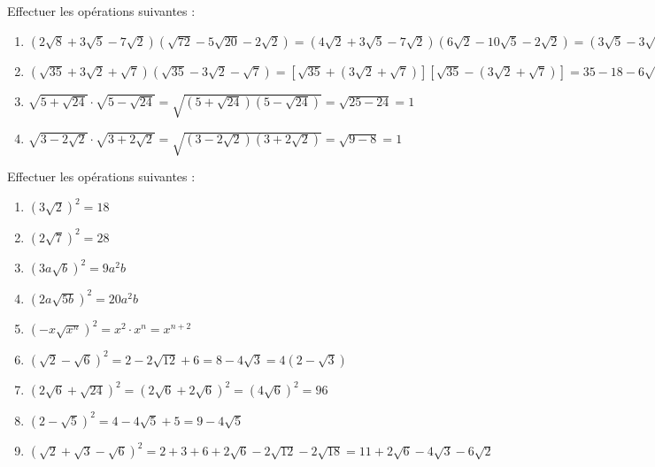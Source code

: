\begin{solution}
Effectuer les opérations suivantes :
\begin{enumerate}
\item $\left( 2\sqrt{8}+3\sqrt{5}-7\sqrt{2} \right)\left( \sqrt{72}-5\sqrt{20}-2\sqrt{2} \right)=\left( 4\sqrt{2}+3\sqrt{5}-7\sqrt{2} \right)\left( 6\sqrt{2}-10\sqrt{5}-2\sqrt{2} \right)=\left( 3\sqrt{5}-3\sqrt{2} \right)\left( 4\sqrt{2}-10\sqrt{5} \right)=6\left( \sqrt{5}-\sqrt{2} \right)\left( 2\sqrt{2}-5\sqrt{5} \right)6\left[ 2\sqrt{10}-25-4+5\sqrt{10} \right]=6\left( 7\sqrt{10}-29 \right)=42\sqrt{10}-174$
\item $\left( \sqrt{35}+3\sqrt{2}+\sqrt{7} \right)\left( \sqrt{35}-3\sqrt{2}-\sqrt{7} \right)=\left[ \sqrt{35}+\left( 3\sqrt{2}+\sqrt{7} \right) \right]\left[ \sqrt{35}-\left( 3\sqrt{2}+\sqrt{7} \right) \right]=35-18-6\sqrt{14}-7=10-6\sqrt{14}=2(5-3\sqrt{14})$
\item $\sqrt{5+\sqrt{24}}\cdot \sqrt{5-\sqrt{24}}=\sqrt{\left( 5+\sqrt{24} \right)\left( 5-\sqrt{24} \right)}=\sqrt{25-24}=1$
\item $\sqrt{3-2\sqrt{2}}\cdot \sqrt{3+2\sqrt{2}}=\sqrt{\left( 3-2\sqrt{2} \right)\left( 3+2\sqrt{2} \right)}=\sqrt{9-8}=1$
\end{enumerate}
\end{solution}

\begin{solution}
Effectuer les opérations suivantes :

\begin{enumerate}
\item ${{\left( 3\sqrt{2} \right)}^{2}}=18$
\item ${{\left( 2\sqrt{7} \right)}^{2}}=28$
\item ${{\left( 3a\sqrt{b} \right)}^{2}}=9{{a}^{2}}b$
\item ${{\left( 2a\sqrt{5b} \right)}^{2}}=20{{a}^{2}}b$
\item ${{\left( -x\sqrt{{{x}^{n}}} \right)}^{2}}={{x}^{2}}\cdot {{x}^{n}}={{x}^{n+2}}$
\item ${{\left( \sqrt{2}-\sqrt{6} \right)}^{2}}=2-2\sqrt{12}+6=8-4\sqrt{3}=4(2-\sqrt{3})$
\item ${{\left( 2\sqrt{6}+\sqrt{24} \right)}^{2}}={{\left( 2\sqrt{6}+2\sqrt{6} \right)}^{2}}={{\left( 4\sqrt{6} \right)}^{2}}=96$
\item ${{\left( 2-\sqrt{5} \right)}^{2}}=4-4\sqrt{5}+5=9-4\sqrt{5}$
\item ${{\left( \sqrt{2}+\sqrt{3}-\sqrt{6} \right)}^{2}}=2+3+6+2\sqrt{6}-2\sqrt{12}-2\sqrt{18}=11+2\sqrt{6}-4\sqrt{3}-6\sqrt{2}$
\end{enumerate}
\end{solution}

